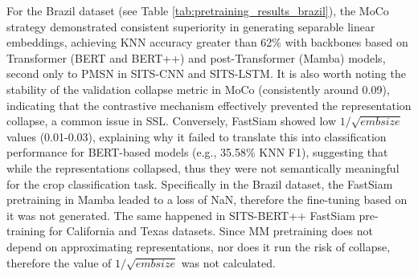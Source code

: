 For the Brazil dataset (see Table \ref{tab:pretraining_results_brazil}), the MoCo strategy demonstrated consistent superiority in generating separable linear embeddings, achieving KNN accuracy greater than 62\% with backbones based on Transformer (BERT and BERT++) and post-Transformer (Mamba) models, second only to PMSN in SITS-CNN and SITS-LSTM. It is also worth noting the stability of the validation collapse metric in \ac{MoCo} (consistently around 0.09), indicating that the contrastive mechanism effectively prevented the representation collapse, a common issue in \ac{SSL}. Conversely, FastSiam showed low $1/\sqrt{embsize}$ values (0.01-0.03), explaining why it failed to translate this into classification performance for BERT-based models (e.g., 35.58\% KNN F1), suggesting that while the representations collapsed, thus they were not semantically meaningful for the crop classification task. Specifically in the Brazil dataset, the FastSiam pretraining in Mamba leaded to a loss of NaN, therefore the fine-tuning based on it was not generated. The same happened in SITS-BERT++ FastSiam pre-training for California and Texas datasets. Since \ac{MM} pretraining does not depend on approximating representations, nor does it run the risk of collapse, therefore the value of $1/\sqrt{embsize}$ was not calculated.

